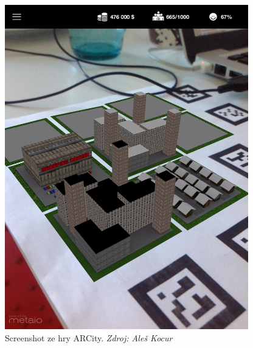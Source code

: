 \documentclass[twoside,12pt]{article}
\begin{document}
\begin{figure}[H]
\centering
    \includegraphics[width=400px, center]{images/screenshot3.jpg}
\captionsetup{justification=centering}
    \caption{Screenshot ze hry ARCity. \textit{Zdroj: Aleš Kocur}}
    \label{screenshot3}
\end{figure}
\end{document}
